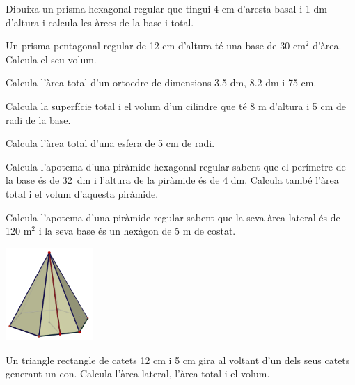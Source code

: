 \begin{activitats}
\begin{mylist}
\exer  Dibuixa un prisma hexagonal regular que tingui 4 cm d'aresta basal i 1 dm d'altura i calcula les àrees de la base i total.


\exer  Un prisma pentagonal regular de 12 cm d'altura té una base de 30 cm${}^{2}$ d'àrea. Calcula el seu volum.


\exer  Calcula l'àrea total d'un ortoedre de dimensions 3.5 dm, 8.2 dm i 75 cm.


\exer  Calcula la superfície total i el volum d'un cilindre que té 8 m d'altura i 5 cm de radi de la base.


\exer  Calcula l'àrea total d'una esfera de 5 cm de radi.


\exer  Calcula l'apotema d'una piràmide hexagonal regular sabent que el perímetre de la base és de 32~dm i l'altura de la piràmide és de 4 dm. Calcula també l'àrea total i el volum d'aquesta piràmide.


\exer[1]  Calcula l'apotema d'una piràmide regular sabent que la seva àrea lateral és de 120 m${}^{2}$ i la seva base és un hexàgon de 5 m de costat.

\begin{center}
	\includegraphics[width=0.25\textwidth]{img-11/piramide6}
\end{center}


\exer  Un triangle rectangle de catets 12 cm i 5 cm gira al voltant d'un dels seus catets generant un con. Calcula l'àrea lateral, l'àrea total i el volum.


\end{mylist}
\end{activitats}
